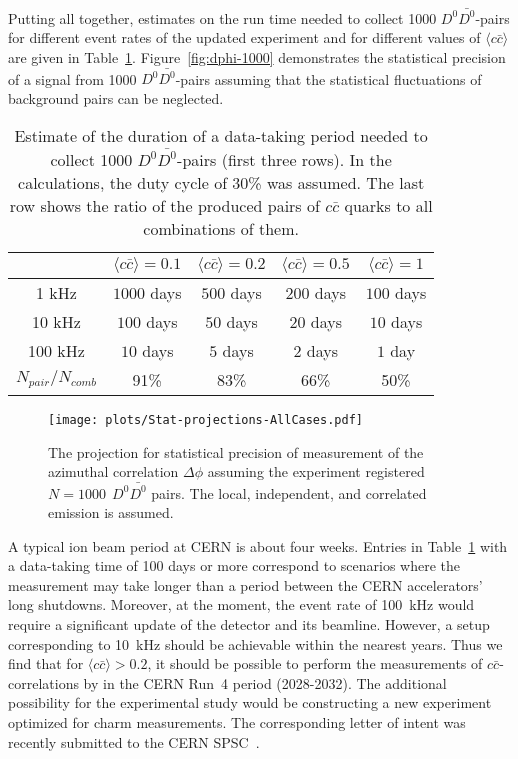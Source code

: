 \documentclass[floatfix,superscriptaddress,a4paper,
               showpieces,showkeys,nofootinbib,preprint]{revtex4-2}
\begin{document}
Putting all together, estimates on the run time needed to collect 1000 $D^0\bar{D^0}$-pairs for different event rates of the updated 
\NASixtyOne experiment and for different values of $\langle c\bar{c} \rangle$ are given in Table~\ref{tab:times}. Figure~\ref{fig:dphi-1000} demonstrates the statistical precision of a signal from 1000 $D^0\bar{D^0}$-pairs assuming that the
statistical fluctuations of background pairs can be neglected.


\begin{table}[h]
\begin{tabular}{|c|c|c|c|c|}
    \hline
              & $\langle c\bar{c} \rangle = 0.1$         & $\langle c\bar{c} \rangle = 0.2$          & $\langle c\bar{c} \rangle = 0.5$     & $\langle c\bar{c} \rangle = 1$           \\ \hline
    1 kHz     & $1000$ days & $500$ days   & $200$ days  & $100$ days  \\ \hline
    10 kHz    & $100$ days  & $50$ days    & $20$ days   & $10$ days   \\ \hline
    100 kHz   & $10$ days   & $5$ days     & $2$ days    & $1$ day     \\ \hline
            \hline
    $N_{pair}/N_{comb}$ & 91\% & 83\%  & 66\%             & 50\%             \\ \hline
\end{tabular}
\caption{\label{tab:times} Estimate of the duration of a data-taking period needed to collect 1000 $D^0\bar{D^0}$-pairs (first three rows). 
In the calculations, the duty cycle of 30\% was assumed.
The last row shows the ratio of the produced pairs of $c\bar{c}$ quarks to all combinations of them.   
}
\end{table}


\begin{figure}[ht] \label{fig:dphi-1000}
    \texttt{[image: plots/Stat-projections-AllCases.pdf]}
    \caption{The projection for statistical precision of measurement of the azimuthal correlation $\Delta \phi$ assuming the experiment registered $N = 1000~~ D^0\bar{D^0}$ pairs. The local, independent, and correlated emission is assumed. }
\label{fig:Sim:Corr2}
\end{figure}

A typical ion beam period at CERN is about four weeks.
Entries in Table~\ref{tab:times} with a data-taking time of 100 days or more correspond to scenarios where the measurement may take longer than a period between
the CERN accelerators' long shutdowns. Moreover, at the moment, the event rate of 100~kHz would require a significant update of the \NASixtyOne detector and its beamline. However, a setup corresponding to 10~kHz should be achievable within the nearest years. Thus
we find that for $\langle c\bar{c} \rangle > 0.2$, it should be possible to perform the measurements of $c\bar{c}$-correlations by \NASixtyOne in the CERN Run~4 period (2028-2032).
The additional possibility for the experimental study would be constructing a new
experiment optimized for charm measurements. The corresponding letter of intent was recently submitted to the CERN SPSC~\cite{Ahdida:2845241}. 
  
\end{document}
